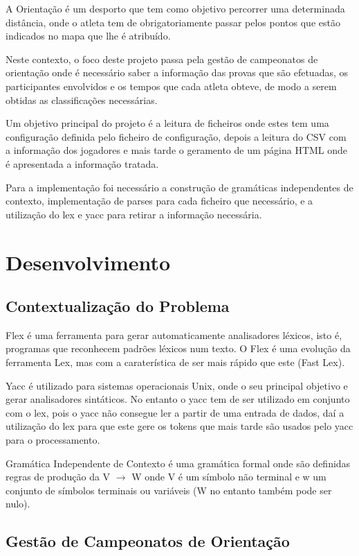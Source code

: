 \documentclass[11pt, a4paper, oneside]{article}
\begin{document}
A Orientação é um desporto que tem como objetivo percorrer uma determinada distância, onde o atleta tem de obrigatoriamente passar pelos pontos que estão indicados no mapa que lhe é atribuído.

Neste contexto, o foco deste projeto passa pela gestão de campeonatos de orientação onde é necessário saber a informação das provas que são efetuadas, os participantes envolvidos e os tempos que cada atleta obteve, de modo a serem obtidas as classificações necessárias.

Um objetivo principal do projeto é a leitura de ficheiros onde estes tem uma configuração definida pelo ficheiro de configuração, depois a leitura do CSV com a informação dos jogadores e mais tarde o geramento de um página HTML onde é apresentada a informação tratada.

Para a implementação foi necessário a construção de gramáticas independentes de contexto, implementação de parses para cada ficheiro que necessário, e a utilização do lex e yacc para retirar a informação necessária.


\newpage
\section{Desenvolvimento}

\subsection{Contextualização do Problema}

Flex é uma ferramenta para gerar automaticamente analisadores léxicos, isto é, programas que reconhecem padrões léxicos num texto. O Flex é uma evolução da ferramenta Lex, mas com a caraterística de ser mais rápido que este (Fast Lex).

Yacc é utilizado para sistemas operacionais Unix, onde o seu principal objetivo e gerar analisadores sintáticos. No entanto o yacc tem de ser utilizado em conjunto com o lex, pois o yacc não consegue ler a partir de uma entrada de dados, daí a utilização  do lex para que este gere os tokens que mais tarde são usados pelo yacc para o processamento.

Gramática Independente de Contexto é uma gramática formal onde são definidas regras de produção da 
 V $\rightarrow$ W onde V é um símbolo não terminal e w um conjunto de símbolos terminais ou variáveis (W no entanto também pode ser nulo).

\subsection{Gestão de Campeonatos de Orientação}
\end{document}
